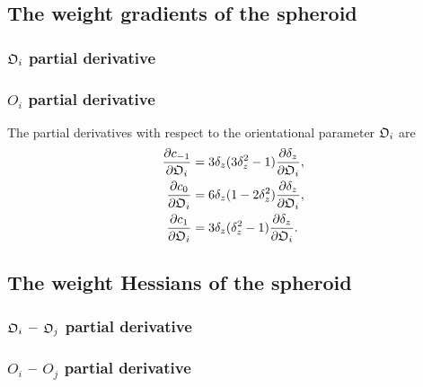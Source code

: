 
\subsection{The weight gradients of the spheroid}


\begin{latexonly}
    \subsubsection{$\mathfrak{O}_i$ partial derivative}
\end{latexonly}
\begin{htmlonly}
    \subsubsection{$O_i$ partial derivative}
\end{htmlonly}

The partial derivatives with respect to the orientational parameter $\mathfrak{O}_i$ are
\begin{subequations}
\begin{align}
    \frac{\partial c_{-1}}{\partial \mathfrak{O}_i} &= 3\delta_z (3\delta_z^2 - 1) \frac{\partial \delta_z}{\partial \mathfrak{O}_i}, \\
    \frac{\partial c_{0}}{\partial \mathfrak{O}_i}  &= 6\delta_z (1 - 2\delta_z^2) \frac{\partial \delta_z}{\partial \mathfrak{O}_i}, \\
    \frac{\partial c_{1}}{\partial \mathfrak{O}_i}  &= 3\delta_z (\delta_z^2 - 1)  \frac{\partial \delta_z}{\partial \mathfrak{O}_i}.
\end{align}
\end{subequations}




\subsection{The weight Hessians of the spheroid}


\begin{latexonly}
    \subsubsection{$\mathfrak{O}_i$ -- $\mathfrak{O}_j$ partial derivative}
\end{latexonly}
\begin{htmlonly}
    \subsubsection{$O_i$ -- $O_j$ partial derivative}
\end{htmlonly}

